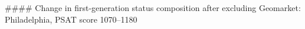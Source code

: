 #### Change in first-generation status composition after excluding Geomarket: Philadelphia, PSAT score 1070–1180
